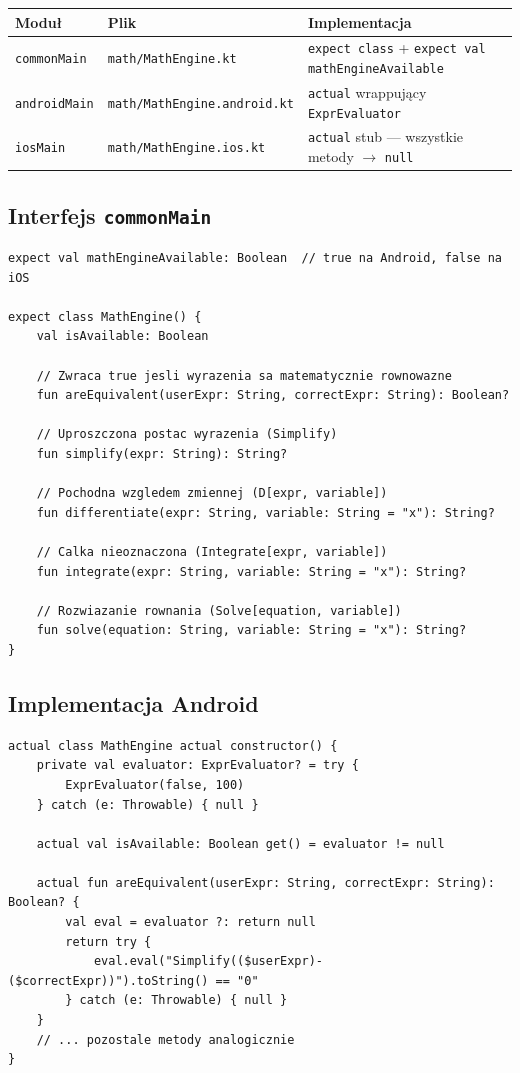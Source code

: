 \documentclass[11pt,a4paper]{article}
\begin{document}
\begin{center}
\begin{tabular}{lll}
\toprule
\textbf{Moduł} & \textbf{Plik} & \textbf{Implementacja} \\
\midrule
\texttt{commonMain} & \texttt{math/MathEngine.kt}
  & \texttt{expect class} + \texttt{expect val mathEngineAvailable} \\
\texttt{androidMain} & \texttt{math/MathEngine.android.kt}
  & \texttt{actual} wrappujący \texttt{ExprEvaluator} \\
\texttt{iosMain} & \texttt{math/MathEngine.ios.kt}
  & \texttt{actual} stub — wszystkie metody $\to$ \texttt{null} \\
\bottomrule
\end{tabular}
\end{center}

\subsection{Interfejs \texttt{commonMain}}

\begin{lstlisting}
expect val mathEngineAvailable: Boolean  // true na Android, false na iOS

expect class MathEngine() {
    val isAvailable: Boolean

    // Zwraca true jesli wyrazenia sa matematycznie rownowazne
    fun areEquivalent(userExpr: String, correctExpr: String): Boolean?

    // Uproszczona postac wyrazenia (Simplify)
    fun simplify(expr: String): String?

    // Pochodna wzgledem zmiennej (D[expr, variable])
    fun differentiate(expr: String, variable: String = "x"): String?

    // Calka nieoznaczona (Integrate[expr, variable])
    fun integrate(expr: String, variable: String = "x"): String?

    // Rozwiazanie rownania (Solve[equation, variable])
    fun solve(equation: String, variable: String = "x"): String?
}
\end{lstlisting}

\subsection{Implementacja Android}

\begin{lstlisting}
actual class MathEngine actual constructor() {
    private val evaluator: ExprEvaluator? = try {
        ExprEvaluator(false, 100)
    } catch (e: Throwable) { null }

    actual val isAvailable: Boolean get() = evaluator != null

    actual fun areEquivalent(userExpr: String, correctExpr: String): Boolean? {
        val eval = evaluator ?: return null
        return try {
            eval.eval("Simplify(($userExpr)-($correctExpr))").toString() == "0"
        } catch (e: Throwable) { null }
    }
    // ... pozostale metody analogicznie
}
\end{lstlisting}
\end{document}
